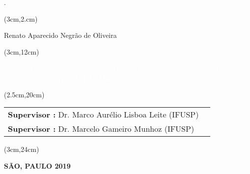 \begin{titlepage}.
    

    \vspace{3.5cm}

    
    \begin{textblock*}{15cm}(3cm,2.cm)
        \makeatletter
        \begin{huge}
            \begin{center}
                \color{black}
                 Renato Aparecido Negrão de Oliveira\\ 
            \end{center}
         \end{huge}
     
    \end{textblock*}
    
    \begin{textblock*}{15cm}(3cm,12cm)
        \begin{Huge}
            \begin{center}
                \makeatletter
                \noindent\textcolor{white}{Desenvolvimento de um detector de silício frontal para a medida de trajetórias e tempo no experimento ATLAS-LHC}
                \makeatother
            \end{center}
        \end{Huge}
    \end{textblock*}

    \begin{textblock*}{15cm}(2.5cm,20cm)
        \makeatletter
        \begin{LARGE}
            \setcellgapes{4pt}
            \makegapedcells
            {\color{black}\begin{tabularx}{15cm}{XX}
                \textbf{Supervisor :} Dr. Marco Aurélio Lisboa Leite (IFUSP)\\ 
                \textbf{Supervisor :} Dr. Marcelo Gameiro Munhoz (IFUSP)
            \end{tabularx}}
        \end{LARGE}
        \makeatother
    \end{textblock*}
    
    \begin{textblock*}{15cm}(3cm,24cm)
        \makeatletter
        \begin{center}
            {\color{black}
                \textbf{SÃO, PAULO 2019} 
            }
        \end{center}
        \makeatother
    \end{textblock*}

\end{titlepage}

